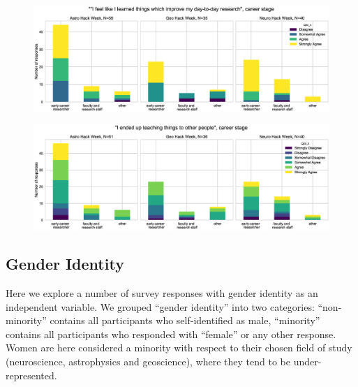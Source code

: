 \documentclass{aastex62}
\begin{document}
\begin{figure}[h!]
\centering
\includegraphics[width=\textwidth]{Q24_4_Q3_stackedbars.eps}
\caption{}
\label{fig:corr3}
\end{figure}

\begin{figure}[h!]
\centering
\includegraphics[width=\textwidth]{Q23_2_Q3_stackedbars.eps}
\caption{}
\label{fig:corr4}
\end{figure}

\clearpage

\subsection{Gender Identity}

Here we explore a number of survey responses with gender identity as an independent variable. We grouped ``gender identity'' into two categories: ``non-minority'' contains all participants who self-identified as male, ``minority'' contains all participants who responded with ``female'' or any other response. Women are here considered a minority with respect to their chosen field of study (neuroscience, astrophysics and geoscience), where they tend to be under-represented.
\end{document}
